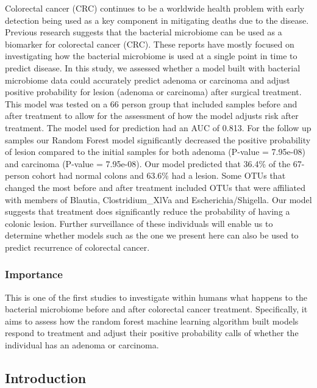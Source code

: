 \documentclass[12pt,]{article}
\begin{document}
Colorectal cancer (CRC) continues to be a worldwide health problem with
early detection being used as a key component in mitigating deaths due
to the disease. Previous research suggests that the bacterial microbiome
can be used as a biomarker for colorectal cancer (CRC). These reports
have mostly focused on investigating how the bacterial microbiome is
used at a single point in time to predict disease. In this study, we
assessed whether a model built with bacterial microbiome data could
accurately predict adenoma or carcinoma and adjust positive probability
for lesion (adenoma or carcinoma) after surgical treatment. This model
was tested on a 66 person group that included samples before and after
treatment to allow for the assessment of how the model adjusts risk
after treatment. The model used for prediction had an AUC of 0.813. For
the follow up samples our Random Forest model significantly decreased
the positive probability of lesion compared to the initial samples for
both adenoma (P-value = 7.95e-08) and carcinoma (P-value = 7.95e-08).
Our model predicted that 36.4\% of the 67-person cohort had normal
colons and 63.6\% had a lesion. Some OTUs that changed the most before
and after treatment included OTUs that were affiliated with members of
Blautia, Clostridium\_XlVa and Escherichia/Shigella. Our model suggests
that treatment does significantly reduce the probability of having a
colonic lesion. Further surveillance of these individuals will enable us
to determine whether models such as the one we present here can also be
used to predict recurrence of colorectal cancer.

\newpage

\subsubsection{Importance}\label{importance}

This is one of the first studies to investigate within humans what
happens to the bacterial microbiome before and after colorectal cancer
treatment. Specifically, it aims to assess how the random forest machine
learning algorithm built models respond to treatment and adjust their
positive probability calls of whether the individual has an adenoma or
carcinoma.

\newpage

\subsection{Introduction}\label{introduction}
\end{document}
